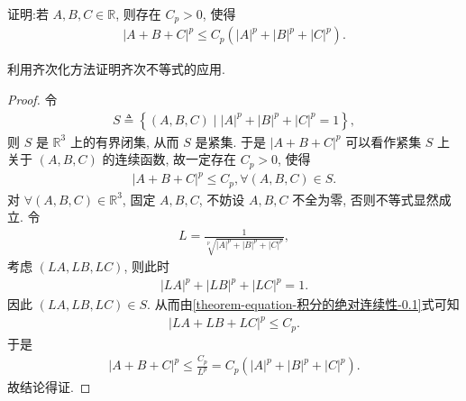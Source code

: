 \documentclass[../../main.tex]{subfiles}%
\begin{document}
\begin{lemma}\label{lemma:齐次化方法应用(三元p次方)}
证明:若 $A,B,C\in \mathbb{R}$, 则存在 $C_p>0$, 使得
\begin{align*}
|A + B + C|^p \leqslant C_p(|A|^p + |B|^p + |C|^p).
\end{align*}
\end{lemma}
\begin{note}
利用齐次化方法证明齐次不等式的应用.
\end{note}
\begin{proof}
令
\begin{align*}
S \triangleq \left\{ (A,B,C) \mid |A|^p + |B|^p + |C|^p = 1 \right\},
\end{align*}
则 $S$ 是 $\mathbb{R}^3$ 上的有界闭集, 从而 $S$ 是紧集. 于是 $|A + B + C|^p$ 可以看作紧集 $S$ 上关于 $(A,B,C)$ 的连续函数, 故一定存在 $C_p > 0$, 使得
\begin{align}
|A + B + C|^p \leqslant C_p, \forall (A,B,C) \in S. \label{theorem-equation-积分的绝对连续性-0.1}
\end{align}
对 $\forall (A,B,C) \in \mathbb{R}^3$, 固定 $A,B,C$, 不妨设 $A,B,C$ 不全为零, 否则不等式显然成立. 令
\begin{align*}
L = \frac{1}{\sqrt[p]{|A|^p + |B|^p + |C|^p}},
\end{align*}
考虑 $(LA,LB,LC)$, 则此时
\begin{align*}
|LA|^p + |LB|^p + |LC|^p = 1.
\end{align*}
因此 $(LA,LB,LC) \in S$. 从而由\eqref{theorem-equation-积分的绝对连续性-0.1}式可知
\begin{align*}
|LA + LB + LC|^p \leqslant C_p.
\end{align*}
于是
\begin{align*}
|A + B + C|^p \leqslant \frac{C_p}{L^p} = C_p(|A|^p + |B|^p + |C|^p).
\end{align*}
故结论得证. 
\end{proof}
\end{document}
